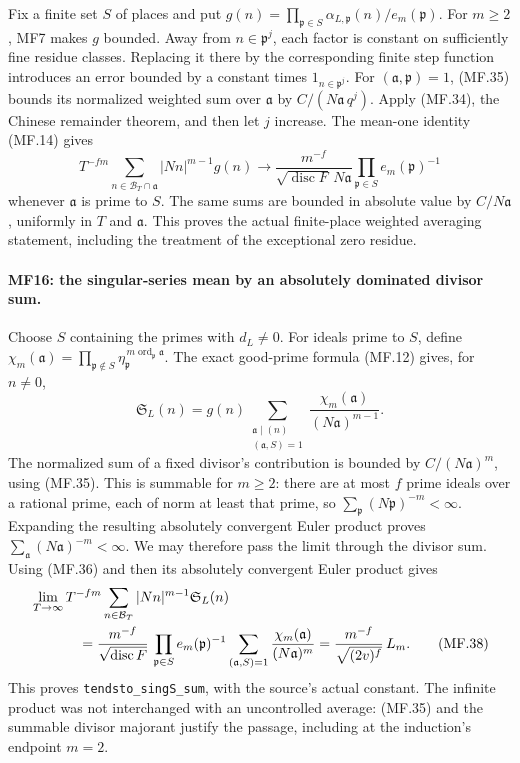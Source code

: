 Fix a finite set \(S\) of places and put
\(g(n)=\prod_{\mathfrak p\in S}\alpha_{L,\mathfrak p}(n)/
e_m(\mathfrak p)\). For \(m\ge2\), MF7 makes \(g\) bounded.
Away from \(n\in\mathfrak p^j\), each factor is constant on
sufficiently fine residue classes. Replacing it there by the
corresponding finite step function introduces an error bounded
by a constant times \(1_{n\in\mathfrak p^j}\).
For \((\mathfrak a,\mathfrak p)=1\), (MF.35) bounds its normalized
weighted sum over \(\mathfrak a\) by
\(C/(N\mathfrak a\,q^j)\).
Apply (MF.34), the Chinese remainder theorem, and then let \(j\)
increase. The mean-one identity (MF.14) gives
\[
 T^{-fm}\sum_{n\in\mathcal B_T\cap\mathfrak a}
        |Nn|^{m-1}g(n)
 \longrightarrow
 \frac{m^{-f}}{\sqrt{\operatorname{disc}F}\,N\mathfrak a}
                   \prod_{\mathfrak p\in S}e_m(\mathfrak p)^{-1}
                                                               \tag{MF.36}
\]
whenever \(\mathfrak a\) is prime to \(S\).
The same sums are bounded in absolute value by \(C/N\mathfrak a\),
uniformly in \(T\) and \(\mathfrak a\). This proves the actual
finite-place weighted averaging statement, including the treatment
of the exceptional zero residue.

\paragraph{MF16: the singular-series mean by an absolutely dominated divisor sum.}
Choose \(S\) containing the primes with \(d_L\ne0\).
For ideals prime to \(S\), define
\(\chi_m(\mathfrak a)=
 \prod_{\mathfrak p\notin S}\eta_{\mathfrak p}^{\,m\operatorname{ord}_{\mathfrak p}\mathfrak a}\).
The exact good-prime formula (MF.12) gives, for \(n\ne0\),
\[
 \mathfrak S_L(n)=g(n)
      \sum_{\substack{\mathfrak a\mid(n)\\(\mathfrak a,S)=1}}
                \frac{\chi_m(\mathfrak a)}{(N\mathfrak a)^{m-1}}.
                                                               \tag{MF.37}
\]
The normalized sum of a fixed divisor's contribution is bounded
by \(C/(N\mathfrak a)^m\), using (MF.35).
This is summable for \(m\ge2\): there are at most \(f\) prime ideals
over a rational prime, each of norm at least that prime, so
\(\sum_{\mathfrak p}(N\mathfrak p)^{-m}<\infty\).
Expanding the resulting absolutely convergent Euler product proves
\(\sum_{\mathfrak a}(N\mathfrak a)^{-m}<\infty\).
We may therefore pass the limit through the divisor sum.
Using (MF.36) and then its absolutely convergent Euler product gives
\[
 \begin{split}
 &\lim_{T\to\infty}T^{-fm}
       \sum_{n\in\mathcal B_T}|Nn|^{m-1}\mathfrak S_L(n)\\
 &\hspace{12mm}=
 \frac{m^{-f}}{\sqrt{\operatorname{disc}F}}\,
       \prod_{\mathfrak p\in S}e_m(\mathfrak p)^{-1}
       \sum_{(\mathfrak a,S)=1}\frac{\chi_m(\mathfrak a)}{(N\mathfrak a)^m}
   =\frac{m^{-f}}{\sqrt{(2v)^f}}\,L_m.                \tag{MF.38}
 \end{split}
\]
This proves \texttt{tendsto\_singS\_sum}, with the source's actual
constant. The infinite product was not interchanged with an
uncontrolled average: (MF.35) and the summable divisor majorant
justify the passage, including at the induction's endpoint \(m=2\).

